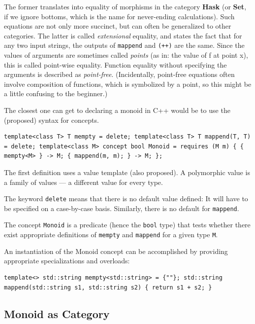 The former translates into equality of morphisms in the category
\textbf{Hask} (or \textbf{Set}, if we ignore bottoms, which is the name
for never-ending calculations). Such equations are not only more
succinct, but can often be generalized to other categories. The latter
is called \emph{extensional} equality, and states the fact that for any
two input strings, the outputs of \texttt{mappend} and \texttt{(++)} are
the same. Since the values of arguments are sometimes called
\emph{points} (as in: the value of f at point x), this is called
point-wise equality. Function equality without specifying the arguments
is described as \emph{point-free}. (Incidentally, point-free equations
often involve composition of functions, which is symbolized by a point,
so this might be a little confusing to the beginner.)

The closest one can get to declaring a monoid in C++ would be to use the
(proposed) syntax for concepts.

\begin{verbatim}
template<class T> T mempty = delete; template<class T> T mappend(T, T) = delete; template<class M> concept bool Monoid = requires (M m) { { mempty<M> } -> M; { mappend(m, m); } -> M; };
\end{verbatim}

The first definition uses a value template (also proposed). A
polymorphic value is a family of values --- a different value for every
type.

The keyword \texttt{delete} means that there is no default value
defined: It will have to be specified on a case-by-case basis.
Similarly, there is no default for \texttt{mappend}.

The concept \texttt{Monoid} is a predicate (hence the \texttt{bool}
type) that tests whether there exist appropriate definitions of
\texttt{mempty} and \texttt{mappend} for a given type \texttt{M}.

An instantiation of the Monoid concept can be accomplished by providing
appropriate specializations and overloads:

\begin{verbatim}
template<> std::string mempty<std::string> = {""}; std::string mappend(std::string s1, std::string s2) { return s1 + s2; }
\end{verbatim}

\subsection{Monoid as Category}\label{monoid-as-category}


